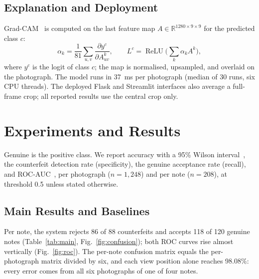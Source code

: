 \documentclass[journal,onecolumn]{IEEEtran}
\begin{document}
\subsection{Explanation and Deployment}
Grad-CAM~\cite{selvaraju2017gradcam} is computed on the last feature map
$A\in\mathbb{R}^{1280\times9\times9}$ for the predicted class $c$:
\begin{equation}
\alpha_k = \frac{1}{81}\sum_{u,v}\frac{\partial y^{c}}{\partial A^{k}_{uv}},\qquad
L^{c} = \operatorname{ReLU}\!\Big(\sum_{k}\alpha_k A^{k}\Big),
\label{eq:gradcam}
\end{equation}
where $y^c$ is the logit of class $c$; the map is normalised, upsampled, and overlaid on
the photograph. The model runs in 37~ms per photograph (median of 30 runs, six CPU threads). The
deployed Flask and Streamlit interfaces also average a full-frame crop; all reported
results use the central crop only.

\section{Experiments and Results}
\label{sec:results}

Genuine is the positive class. We report accuracy with a 95\% Wilson
interval~\cite{wilson1927probable}, the counterfeit detection rate (specificity), the
genuine acceptance rate (recall), and ROC-AUC~\cite{fawcett2006roc}, per photograph
($n=1{,}248$) and per note ($n=208$), at threshold 0.5 unless stated otherwise.

\subsection{Main Results and Baselines}
Per note, the system rejects 86 of 88 counterfeits and accepts 118 of 120 genuine notes
(Table~\ref{tab:main}, Fig.~\ref{fig:confusion}); both ROC curves rise almost vertically
(Fig.~\ref{fig:roc}). The per-note confusion matrix equals the per-photograph matrix
divided by six, and each view position alone reaches 98.08\%: every error comes from all
six photographs of one of four notes.
\end{document}
